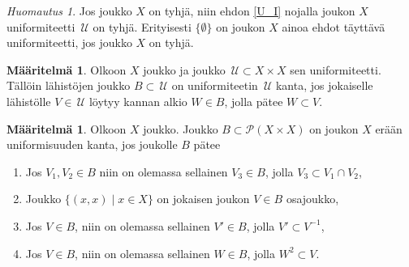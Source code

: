 \documentclass[12pt,a4paper,leqno]{report}
\newcommand{\U}{\,\mathcal{U}}
\newcommand{\Pot}{\mathcal{P}}
\theoremstyle{plain}
\theoremstyle{definition}
\newtheorem{maar}[equation]{Määritelmä}
\theoremstyle{remark}
\newtheorem{huom}[equation]{Huomautus}
\begin{document}
\begin{huom}
Jos joukko $X$ on tyhjä, niin ehdon \ref{U_I} 
nojalla joukon $X$ uniformiteetti $\U$ on tyhjä. Erityisesti $\{\emptyset\}$ on joukon $X$ ainoa ehdot täyttävä uniformiteetti, jos joukko $X$ on tyhjä.
\end{huom}
\begin{maar}
Olkoon $X$ joukko ja joukko $\U\subset X\times X$ sen uniformiteetti. Tällöin lähistöjen joukko $B\subset \U$ on uniformiteetin $\U$ kanta, jos jokaiselle lähistölle $V\in\U$ löytyy kannan alkio $W\in B$, jolla pätee $W\subset V$.
\end{maar}
\begin{maar}\label{uniformin kannan maar}
Olkoon $X$ joukko. Joukko $B\subset \Pot (X\times X)$ on joukon $X$ erään uniformisuuden kanta, jos joukolle $B$ pätee
\begin{enumerate} [label=(B\arabic*)]
\item\label{B_I} Jos $V_1,V_2\in B$ niin on olemassa sellainen $V_3\in B$, jolla $V_3\subset V_1\cap V_2$,
\item\label{U'_I} Joukko $\{(x,x)\mid x\in X\}$ on jokaisen joukon $V\in B$ osajoukko,
\item\label{U'_II} Jos $V\in B$, niin on olemassa sellainen $V'\in B$, jolla $V'\subset V^{-1}%
$,
\item\label{U'_III} Jos $V\in B$, niin on olemassa sellainen $W\in B$, jolla $ W^2\subset V$.%
\end{enumerate}
\end{maar}
\end{document}
